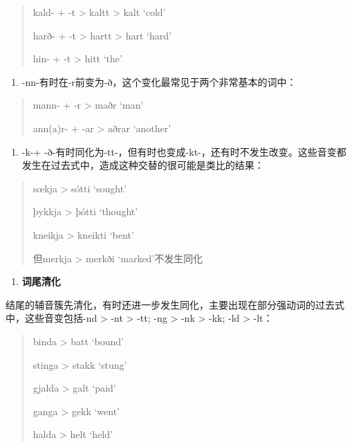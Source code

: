 \begin{quote}
  kald- + -t \textgreater{} kaltt \textgreater{} kalt `cold'

  harð- + -t \textgreater{} hartt \textgreater{} hart `hard'

  hin- + -t \textgreater{} hitt `the'
\end{quote}

\begin{enumerate}
  \def\labelenumi{(\alph{enumi})}
  \setcounter{enumi}{3}
  \item
        -nn-有时在-r前变为-ð，这个变化最常见于两个非常基本的词中：
\end{enumerate}

\begin{quote}
  mann- + -r \textgreater{} maðr `man'

  ann(a)r- + -ar \textgreater{} aðrar `another'
\end{quote}

\begin{enumerate}
  \def\labelenumi{(\alph{enumi})}
  \setcounter{enumi}{4}
  \item
        -k-+
        -ð-有时同化为-tt-，但有时也变成-kt-，还有时不发生改变。这些音变都发生在过去式中，造成这种交替的很可能是类比的结果：
\end{enumerate}

\begin{quote}
  sœkja \textgreater{} sótti `sought'

  þykkja \textgreater{} þótti `thought'

  kneikja \textgreater{} kneikti `bent'

  但merkja \textgreater{} merkði `marked'不发生同化
\end{quote}

\begin{enumerate}
  \def\labelenumi{\Alph{enumi}.}
  \setcounter{enumi}{1}
  \item
        \textbf{词尾清化}
\end{enumerate}

结尾的辅音簇先清化，有时还进一步发生同化，主要出现在部分强动词的过去式中，这些音变包括-nd
\textgreater{} -nt \textgreater{} -tt; -ng \textgreater{} -nk
\textgreater{} -kk; -ld \textgreater{} -lt：

\begin{quote}
  binda \textgreater{} batt `bound'

  stinga \textgreater{} stakk `stung'

  gjalda \textgreater{} galt `paid'

  ganga \textgreater{} gekk `went'

  halda \textgreater{} helt `held'
\end{quote}

